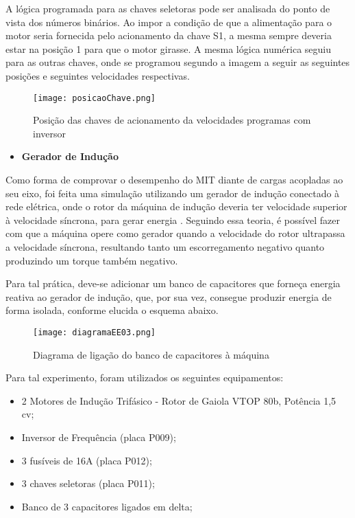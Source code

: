 		A lógica programada para as chaves seletoras pode ser analisada do ponto de vista dos números binários. Ao impor a condição de que a alimentação para o motor seria fornecida pelo acionamento da chave S1, a mesma sempre deveria estar na posição 1 para que o motor girasse. A mesma lógica numérica seguiu para as outras chaves, onde se programou segundo a imagem a seguir as seguintes posições e seguintes velocidades respectivas.

		\begin{figure}[!h]
			\centering
			\texttt{[image: posicaoChave.png]}
			\caption[Posição das chaves de acionamento da velocidades programas com inversor]{Posição das chaves de acionamento da velocidades programas com inversor} 
			\label{posicaoChave}
		\end{figure}


		\begin{itemize}
		\item \textbf{Gerador de Indução}
		\end{itemize}

			Como forma de comprovar o desempenho do MIT diante de cargas acopladas ao seu eixo, foi feita uma simulação utilizando um gerador de indução conectado à rede elétrica, onde o rotor da máquina de indução deveria ter velocidade superior à velocidade síncrona, para gerar energia \cite{Nascimento}. Seguindo essa teoria, é possível fazer com que a máquina opere como gerador quando a velocidade do rotor ultrapassa a velocidade síncrona, resultando tanto um escorregamento negativo quanto produzindo um torque também negativo.
			
			Para tal prática, deve-se adicionar um banco de capacitores que forneça energia reativa ao gerador de indução, que, por sua vez, consegue produzir energia de forma isolada, conforme elucida o esquema abaixo.

			\begin{figure}[!h]
				\centering
				\texttt{[image: diagramaEE03.png]}
				\caption[Diagrama de ligação do banco de capacitores à máquina]{Diagrama de ligação do banco de capacitores à máquina \cite{Nascimento}} 
				\label{diagramaEE03}
			\end{figure}

			Para tal experimento, foram utilizados os seguintes equipamentos:

			\begin{itemize}
				\item 2 Motores de Indução Trifásico - Rotor de Gaiola VTOP 80b, Potência 1,5 cv;
				\item Inversor de Frequência (placa P009);
				\item 3 fusíveis de 16A (placa P012);
				\item 3 chaves seletoras (placa P011);
				\item Banco de 3 capacitores ligados em delta;
			\end{itemize}

